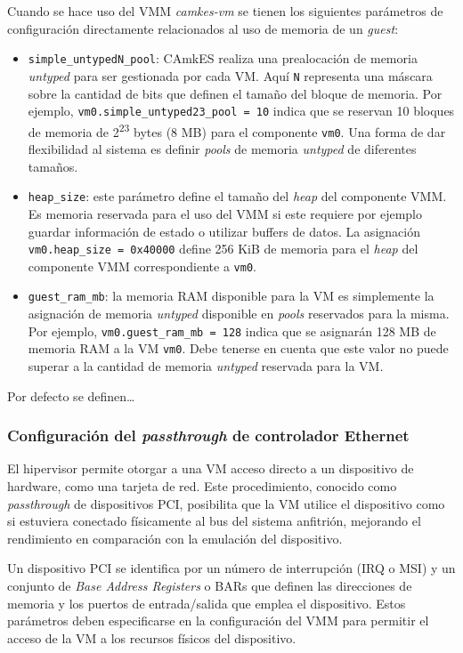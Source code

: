 Cuando se hace uso del VMM \textit{camkes-vm} se tienen los siguientes parámetros de configuración directamente relacionados al uso de memoria de un \textit{guest}:
\begin{itemize}
    \item \texttt{simple\_untypedN\_pool}: CAmkES realiza una prealocación de memoria \textit{untyped} para ser gestionada por cada VM. Aquí \texttt{N} representa una máscara sobre la cantidad de bits que definen el tamaño del bloque de memoria. Por ejemplo, \texttt{vm0.simple\_untyped23\_pool = 10} indica que se reservan 10 bloques de memoria de 2\textsuperscript{23} bytes (8 MB) para el componente \texttt{vm0}. Una forma de dar flexibilidad al sistema es definir \textit{pools} de memoria \textit{untyped} de diferentes tamaños. 
    \item \texttt{heap\_size}: este parámetro define el tamaño del \textit{heap} del componente VMM. Es memoria reservada para el uso del VMM si este requiere por ejemplo guardar información de estado o utilizar buffers de datos. La asignación \texttt{vm0.heap\_size = 0x40000} define 256 KiB de memoria para el \textit{heap} del componente VMM correspondiente a \texttt{vm0}.
    \item \texttt{guest\_ram\_mb}: la memoria RAM disponible para la VM es simplemente la asignación de memoria \textit{untyped} disponible en \textit{pools} reservados para la misma. Por ejemplo, \texttt{vm0.guest\_ram\_mb = 128} indica que se asignarán 128 MB de memoria RAM a la VM \texttt{vm0}. Debe tenerse en cuenta que este valor no puede superar a la cantidad de memoria \textit{untyped} reservada para la VM.
\end{itemize}
Por defecto se definen\dots
{}


\subsubsection{Configuración del \textit{passthrough} de controlador Ethernet}
El hipervisor permite otorgar a una VM acceso directo a un dispositivo de hardware, como una tarjeta de red. Este procedimiento, conocido como \textit{passthrough} de dispositivos PCI, posibilita que la VM utilice el dispositivo como si estuviera conectado físicamente al bus del sistema anfitrión, mejorando el rendimiento en comparación con la emulación del dispositivo.

Un dispositivo PCI se identifica por un número de interrupción (IRQ o MSI) y un conjunto de \textit{Base Address Registers} o BARs que definen las direcciones de memoria y los puertos de entrada/salida que emplea el dispositivo. Estos parámetros deben especificarse en la configuración del VMM para permitir el acceso de la VM a los recursos físicos del dispositivo.

